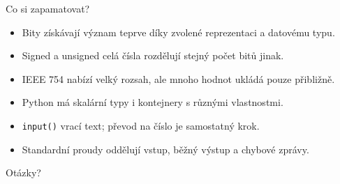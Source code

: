 \documentclass[aspectratio=169]{beamer}
\begin{document}
\begin{frame}{Co si zapamatovat?}
  \begin{itemize}
    \item Bity získávají význam teprve díky zvolené reprezentaci a datovému typu.
    \item Signed a unsigned celá čísla rozdělují stejný počet bitů jinak.
    \item IEEE 754 nabízí velký rozsah, ale mnoho hodnot ukládá pouze přibližně.
    \item Python má skalární typy i kontejnery s různými vlastnostmi.
    \item \texttt{input()} vrací text; převod na číslo je samostatný krok.
    \item Standardní proudy oddělují vstup, běžný výstup a chybové zprávy.
  \end{itemize}
  \vspace{3mm}
  \centering\Large Otázky?
\end{frame}
\end{document}
